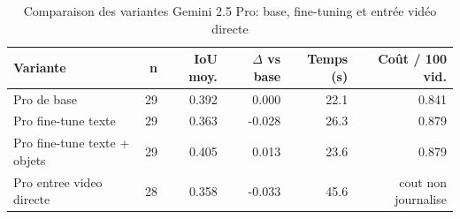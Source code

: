 \begin{table}[ht]
\centering
\footnotesize
\caption{Comparaison des variantes Gemini 2.5 Pro: base, fine-tuning et entr\'ee vid\'eo directe}
\label{tab:llm-pro-variants}
\begin{tabularx}{\textwidth}{>{\raggedright\arraybackslash}Xrrrrr}
\toprule
Variante & n & IoU moy. & $\Delta$ vs base & Temps (s) & Co\^ut / 100 vid. \\
\midrule
Pro de base & 29 & 0.392 & 0.000 & 22.1 & 0.841 \\
Pro fine-tune texte & 29 & 0.363 & -0.028 & 26.3 & 0.879 \\
Pro fine-tune texte + objets & 29 & 0.405 & 0.013 & 23.6 & 0.879 \\
Pro entree video directe & 28 & 0.358 & -0.033 & 45.6 & cout non journalise \\
\bottomrule
\end{tabularx}
\end{table}
